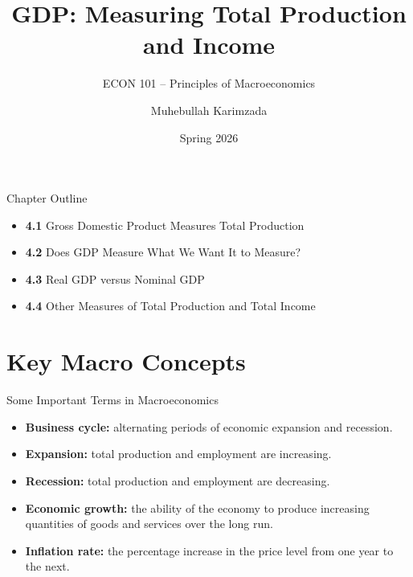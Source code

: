 \documentclass[aspectratio=169]{beamer}
\title{\textbf{GDP: Measuring Total Production and Income}}
\subtitle{{\large ECON 101 -- Principles of Macroeconomics}}
\author{Muhebullah Karimzada}
\date{Spring 2026}
\begin{document}

\begin{frame}[plain]
  \titlepage
\end{frame}

\begin{frame}{Chapter Outline}
\transfade
\begin{itemize}
  \item \textbf{4.1} Gross Domestic Product Measures Total Production
  \item \textbf{4.2} Does GDP Measure What We Want It to Measure?
  \item \textbf{4.3} Real GDP versus Nominal GDP
  \item \textbf{4.4} Other Measures of Total Production and Total Income
\end{itemize}
\end{frame}

\section*{Key Macro Concepts}

\begin{frame}{Some Important Terms in Macroeconomics}
\transfade
\begin{itemize}
  \item \textbf{Business cycle:} alternating periods of economic \alert{expansion} and \alert{recession}.
  \item \textbf{Expansion:} total production and employment are \alert{increasing}.
  \item \textbf{Recession:} total production and employment are \alert{decreasing}.
  \item \textbf{Economic growth:} the ability of the economy to produce increasing quantities of goods and services over the long run.
  \item \textbf{Inflation rate:} the \alert{percentage increase} in the price level from one year to the next.
\end{itemize}
\end{frame}
\end{document}
